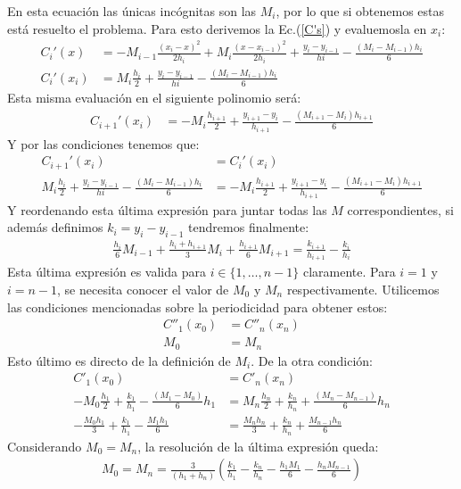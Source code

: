 \documentclass[12pt]{article}
\begin{document}
En esta ecuación las únicas incógnitas son las $M_i$, por lo que si obtenemos estas está resuelto el problema. Para esto derivemos la Ec.(\ref{C's}) y evaluemosla en $x_i$:
\begin{align*}
C_i'(x)&=-M_{i-1}\frac{(x_i-x)^2}{2h_i}+M_i\frac{(x-x_{i-1})^2}{2h_i}+\frac{y_i-y_{i-1}}{hi}-\frac{(M_i-M_{i-1})h_i}{6}\\
C_i'(x_i)&=M_i\frac{h_i}{2}+\frac{y_i-y_{i-1}}{hi}-\frac{(M_i-M_{i-1})h_i}{6}
\end{align*}
Esta misma evaluación en el siguiente polinomio será:
\begin{align*}
C_{i+1}'(x_i)&=-M_i\frac{h_{i+1}}{2}+\frac{y_{i+1}-y_{i}}{h_{i+1}}-\frac{(M_{i+1}-M_{i})h_{i+1}}{6}
\end{align*}
Y por las condiciones tenemos que:
\begin{align*}
C_{i+1}'(x_i)&=C_i'(x_i)\\
M_i\frac{h_i}{2}+\frac{y_i-y_{i-1}}{hi}-\frac{(M_i-M_{i-1})h_i}{6}&=-M_i\frac{h_{i+1}}{2}+\frac{y_{i+1}-y_{i}}{h_{i+1}}-\frac{(M_{i+1}-M_{i})h_{i+1}}{6}
\end{align*}
Y reordenando esta última expresión para juntar todas las $M$ correspondientes, si además definimos $k_i=y_i-y_{i-1}$ tendremos finalmente:
\begin{align}
\label{M}
\frac{h_i}{6}M_{i-1}+\frac{h_i+h_{i+1}}{3}M_i+\frac{h_{i+1}}{6}M_{i+1}=\frac{k_{i+1}}{h_{i+1}}-\frac{k_i}{h_i}
\end{align} 
Esta última expresión es valida para $i \in \{1,\dots,n-1\}$ claramente. Para $i=1$ y $i=n-1$, se necesita conocer el valor de $M_0$ y $M_n$ respectivamente. Utilicemos las condiciones mencionadas sobre la periodicidad para obtener estos:
\begin{align*}
C''_1(x_0)&=C''_n(x_n)\\
M_0&=M_n
\end{align*} 
Esto último es directo de la definición de $M_i$. De la otra condición:
\begin{align*}
C'_1(x_0)&=C'_n(x_n) \\
-M_0\frac{h_1}{2}+\frac{k_1}{h_1}-\frac{(M_1-M_0)}{6}h_1&=M_n\frac{h_n}{2}+\frac{k_n}{h_n}+\frac{(M_n-M_{n-1})}{6}h_n\\
-\frac{M_0h_1}{3}+\frac{k_1}{h_1}-\frac{M_1h_1}{6}&=\frac{M_nh_n}{3}+\frac{k_n}{h_n}+\frac{M_{n-1}h_n}{6}
\end{align*}
Considerando $M_0=M_n$, la resolución de la última expresión queda:
\begin{align*}
M_0=M_n=\frac{3}{(h_1+h_n)}\left(\frac{k_1}{h_1}-\frac{k_n}{h_n}-\frac{h_1M_1}{6}-\frac{h_nM_{n-1}}{6}\right)
\end{align*}
\end{document}
